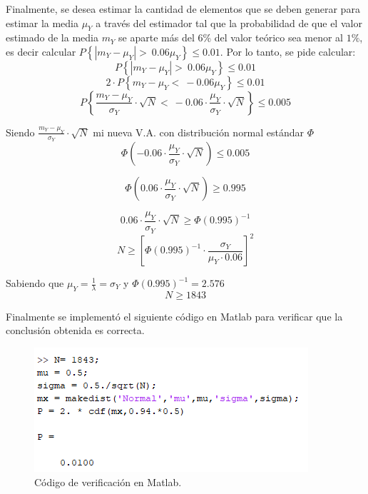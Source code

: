 Finalmente, se desea estimar la cantidad de elementos que se deben generar para estimar la media $\mu_Y$ a través del estimador tal que la probabilidad de que el valor estimado de la media $m_Y$ se aparte más del $6\%$ del valor teórico sea menor al $1\%$, es decir calcular $P\left\lbrace | m_Y - \mu_Y | > \ 0.06 \mu_Y \right\rbrace \leq 0.01$. %
%
Por lo tanto, se pide calcular: 
\begin{equation*}
	P\left\lbrace | m_Y - \mu_Y | > \ 0.06 \mu_Y \right\rbrace \leq 0.01
\end{equation*}
\begin{equation*}
	2\cdot P\left\lbrace m_Y - \mu_Y < \ -0.06 \mu_Y \right\rbrace \leq 0.01
\end{equation*}
\begin{equation*}
	P\left\lbrace  \frac{m_Y - \mu_Y}{\sigma_Y}\cdot \sqrt{N} < \ -0.06 \cdot \frac{\mu_Y}{\sigma_Y}\cdot \sqrt{N} \right\rbrace \leq 0.005
\end{equation*}

Siendo $\frac{m_Y - \mu_Y}{\sigma_Y}\cdot \sqrt{N}$ mi nueva V.A. con distribución normal estándar $\Phi$
\begin{equation*}
\Phi\left( -0.06 \cdot \frac{\mu_Y}{\sigma_Y}\cdot \sqrt{N} \right) \leq 0.005
\end{equation*}

\begin{equation*}
\Phi\left( 0.06 \cdot \frac{\mu_Y}{\sigma_Y}\cdot \sqrt{N} \right) \geq 0.995
\end{equation*}

\begin{equation*}
 0.06 \cdot \frac{\mu_Y}{\sigma_Y}\cdot \sqrt{N} \geq \Phi \left( 0.995 \right)^{-1}
\end{equation*}
\begin{equation*}
	N \geq \left[ \Phi \left( 0.995 \right)^{-1} \cdot \frac{\sigma_Y}{\mu_Y \cdot 0.06}\right]^2
\end{equation*}

Sabiendo que $\mu_Y = \frac{1}{\lambda} = \sigma_Y$ y $\Phi \left( 0.995 \right)^{-1}=2.576$
\begin{equation}
N \geq 1843 
\end{equation}

Finalmente se implementó el siguiente código en Matlab para verificar que la conclusión obtenida es correcta. 
\begin{figure}[H]
	\centering
	\includegraphics[width=0.4\linewidth]{./ImagenesEjercicio1/implemetacion.PNG}
	\caption{Código de verificación en Matlab.}
	\label{fig:imple}
\end{figure}